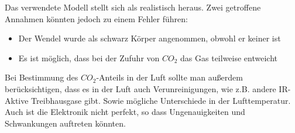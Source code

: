 \documentclass{article}
\begin{document}
            \begin{center}
             
            \end{center}
            

            Das verwendete Modell stellt sich als realistisch heraus. Zwei getroffene Annahmen könnten jedoch zu einem Fehler führen:
            \begin{itemize}
            	\item Der Wendel wurde als schwarz Körper angenommen, obwohl er keiner ist
            	\item Es ist möglich, dass bei der Zufuhr von $CO_2$ das Gas teilweise entweicht
            \end{itemize}
            
            Bei Bestimmung des $CO_2$-Anteils in der Luft sollte man außerdem berücksichtigen, dass es in der Luft auch Verunreinigungen, wie z.B. andere IR-Aktive Treibhausgase gibt. 
            Sowie mögliche Unterschiede in der Lufttemperatur.
            Auch ist die Elektronik nicht perfekt, so dass Ungenauigkeiten und Schwankungen auftreten könnten.
\end{document}
